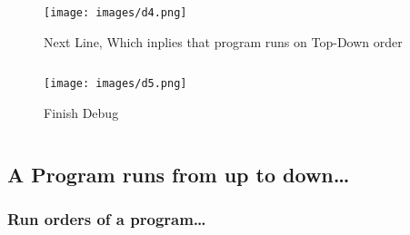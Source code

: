 \documentclass[
  11pt, %
  xcolor=dvipsnames
]{beamer}
\newcounter{image}
\begin{document}
\begin{frame}

	\begin{columns}
		\begin{column}{0.8\textwidth}

			\begin{figure}
				\begin{center}
					\texttt{[image: images/d4.png]}
				\end{center}
				\caption{Next Line, Which inplies that program runs on Top-Down order}\label{fig:9.4}
			\end{figure}

		\end{column}
	\end{columns}
\end{frame}

\begin{frame}

	\begin{columns}
		\begin{column}{0.8\textwidth}
			\begin{figure}
				\begin{center}
					\texttt{[image: images/d5.png]}
				\end{center}
				\caption{Finish Debug}\label{fig:9.5}
			\end{figure}

		\end{column}
	\end{columns}

\end{frame}

\subsection{A Program runs from up to down\dots}
\begin{frame}
	\frametitle{Run orders of a program\dots}

	\begin{columns}
		\begin{column}{0.8\textwidth}

		\end{column}
	\end{columns}

\end{frame}
\end{document}
